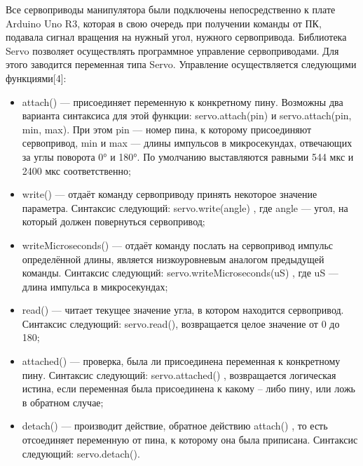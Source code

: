 Все сервоприводы манипулятора были подключены непосредственно к плате Arduino Uno R3, которая в свою очередь при получении команды от ПК, подавала сигнал вращения на нужный угол, нужного сервопривода.
Библиотека Servo позволяет осуществлять программное управление сервоприводами. Для этого заводится переменная типа Servo. Управление осуществляется следующими функциями[4]:
\begin{itemize}
  \item attach() — присоединяет переменную к конкретному пину. Возможны два варианта синтаксиса для этой функции: servo.attach(pin) и servo.attach(pin, min, max). При  этом pin — номер пина, к которому присоединяют сервопривод, min и max — длины импульсов в микросекундах, отвечающих за углы поворота 0° и 180°. По умолчанию выставляются равными 544 мкс и 2400 мкс соответственно;
  \item write() — отдаёт команду сервоприводу принять некоторое значение параметра. Синтаксис следующий: servo.write(angle) , где angle — угол, на который должен повернуться сервопривод;
  \item writeMicroseconds() — отдаёт команду послать на сервопривод импульс определённой длины, является низкоуровневым аналогом предыдущей команды. Синтаксис следующий: servo.writeMicroseconds(uS) , где uS — длина импульса в микросекундах;
  \item read() — читает текущее значение угла, в котором находится сервопривод. Синтаксис следующий: servo.read(), возвращается целое значение от 0 до 180;
  \item attached() — проверка, была ли присоединена переменная к конкретному пину. Синтаксис следующий: servo.attached() , возвращается логическая истина, если переменная была присоединена к какому – либо пину, или ложь в обратном случае;
  \item detach() — производит действие, обратное действию attach() , то есть отсоединяет переменную от пина, к которому она была приписана. Синтаксис следующий: servo.detach().
\end{itemize}
 